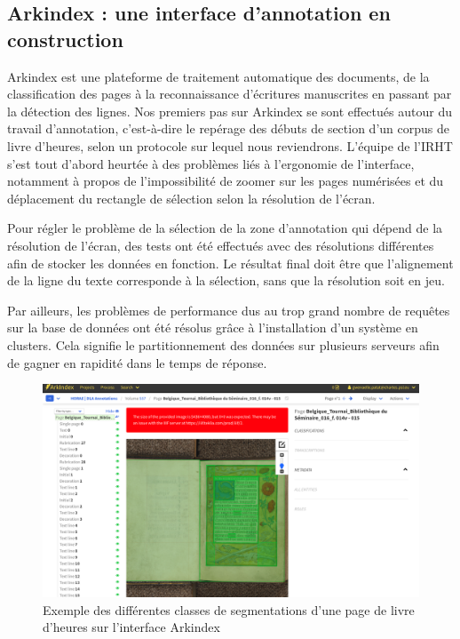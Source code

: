 \documentclass[a4paper,12pt,twoside]{book}
\begin{document}
	
	\subsection{\label{arkindex}Arkindex : une interface d’annotation en construction}
	
		Arkindex est une plateforme de traitement automatique des documents, de la classification des pages à la reconnaissance d’écritures manuscrites en passant par la détection des lignes. Nos premiers pas sur Arkindex se sont effectués autour du travail d'annotation, c'est-à-dire le repérage des débuts de section d'un corpus de livre d'heures, selon un protocole sur lequel nous reviendrons. L'équipe de l'IRHT s'est tout d'abord heurtée à des problèmes liés à l'ergonomie de l'interface, notamment à propos de l'impossibilité de zoomer sur les pages numérisées et du déplacement du rectangle de sélection selon la résolution de l'écran. 
		
	Pour régler le problème de la sélection de la zone d’annotation qui dépend de la résolution de l’écran, des tests ont été effectués avec des résolutions différentes afin de stocker les données en fonction. Le résultat final doit être que l'alignement de la ligne du texte corresponde à la sélection, sans que la résolution soit en jeu.
	
	 Par ailleurs, les problèmes de performance dus au trop grand nombre de requêtes sur la base de données ont été résolus grâce à l'installation d’un système en clusters. Cela signifie le partitionnement des données sur plusieurs serveurs afin de gagner en rapidité dans le temps de réponse. \\
	 
	\begin{figure}[!h]
    \centering
    \includegraphics[width=13cm]{img/ML/interface_arkindex_detection_page.png}

    \caption{Exemple des différentes classes de segmentations d'une page de livre d'heures sur l'interface Arkindex}
    \end{figure}
	
\end{document}
